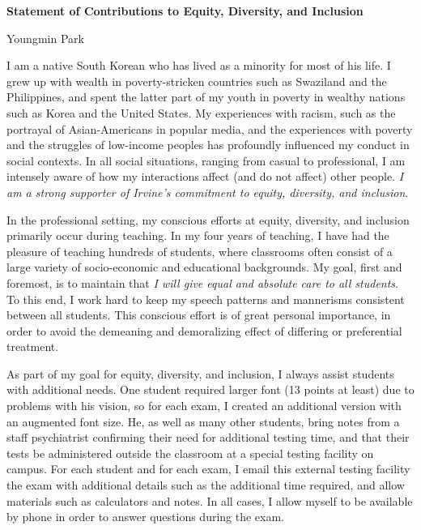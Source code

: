 \documentclass[a4paper,11pt]{article}
\begin{document}
\begin{center}
\Large \textbf{Statement of Contributions to Equity, Diversity, and Inclusion}

\Large Youngmin Park
\end{center}

I am a native South Korean who has lived as a minority for most of his life. I grew up with wealth in poverty-stricken countries such as Swaziland and the Philippines, and spent the latter part of my youth in poverty in wealthy nations such as Korea and the United States. My experiences with racism, such as the portrayal of Asian-Americans in popular media, and the experiences with poverty and the struggles of low-income peoples has profoundly influenced my conduct in social contexts. In all social situations, ranging from casual to professional, I am intensely aware of how my interactions affect (and do not affect) other people. \textit{I am a strong supporter of Irvine's commitment to equity, diversity, and inclusion}.

In the professional setting, my conscious efforts at equity, diversity, and inclusion primarily occur during teaching. In my four years of teaching, I have had the pleasure of teaching hundreds of students, where classrooms often consist of a large variety of socio-economic and educational backgrounds. My goal, first and foremost, is to maintain that \textit{I will give equal and absolute care to all students}. To this end, I work hard to keep my speech patterns and mannerisms consistent between all students. This conscious effort is of great personal importance, in order to avoid the demeaning and demoralizing effect of differing or preferential treatment.

As part of my goal for equity, diversity, and inclusion, I always assist students with additional needs. One student required larger font (13 points at least) due to problems with his vision, so for each exam, I created an additional version with an augmented font size. He, as well as many other students, bring notes from a staff psychiatrist confirming their need for additional testing time, and that their tests be administered outside the classroom at a special testing facility on campus. For each student and for each exam, I email this external testing facility the exam with additional details such as the additional time required, and allow materials such as calculators and notes. In all cases, I allow myself to be available by phone in order to answer questions during the exam.
\end{document}
